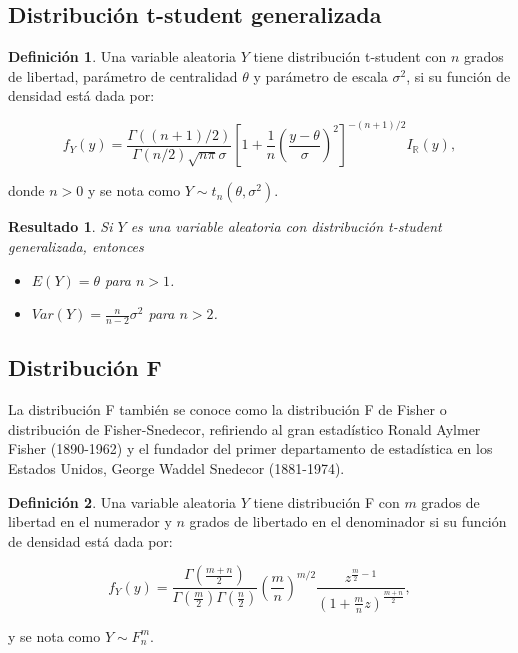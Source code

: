 \documentclass[
  10pt,
  spanish,
]{book}
\providecommand{\tightlist}{%
  \setlength{\itemsep}{0pt}\setlength{\parskip}{0pt}}
\newtheorem{proposition}{Resultado}[chapter]
\theoremstyle{definition}
\newtheorem{definition}{Definición}[chapter]
\theoremstyle{definition}
\theoremstyle{definition}
\theoremstyle{definition}
\theoremstyle{remark}
\begin{document}
\hypertarget{distribuciuxf3n-t-student-generalizada}{%
\subsection{Distribución t-student generalizada}\label{distribuciuxf3n-t-student-generalizada}}

\begin{definition}
\protect\hypertarget{def:unnamed-chunk-46}{}{\label{def:unnamed-chunk-46} }Una variable aleatoria \(Y\) tiene distribución t-student con \(n\) grados de libertad, parámetro de centralidad \(\theta\) y parámetro de escala \(\sigma^2\), si su función de densidad está dada por:

\begin{equation}
f_Y(y)=\frac{\Gamma((n+1)/2)}{\Gamma(n/2)\sqrt{n\pi}\sigma}\left[1+\frac{1}{n}\left(\frac{y-\theta}{\sigma}\right)^2\right]^{-(n+1)/2}
I_\mathbb{R}(y),
\end{equation}

donde \(n>0\) y se nota como \(Y\sim t_n(\theta,\sigma^2)\).
\end{definition}

\begin{proposition}
\protect\hypertarget{prp:unnamed-chunk-47}{}{\label{prp:unnamed-chunk-47} }Si \(Y\) es una variable aleatoria con distribución t-student generalizada, entonces

\begin{itemize}
\tightlist
\item
  \(E(Y)=\theta\) para \(n>1\).
\item
  \(Var(Y)=\frac{n}{n-2}\sigma^2\) para \(n>2\).
\end{itemize}
\end{proposition}

\hypertarget{distribuciuxf3n-f}{%
\subsection{Distribución F}\label{distribuciuxf3n-f}}

La distribución F también se conoce como la distribución F de Fisher o distribución de Fisher-Snedecor, refiriendo al gran estadístico Ronald Aylmer Fisher (1890-1962) y el fundador del primer departamento de estadística en los Estados Unidos, George Waddel Snedecor (1881-1974).

\begin{definition}
\protect\hypertarget{def:unnamed-chunk-48}{}{\label{def:unnamed-chunk-48} }Una variable aleatoria \(Y\) tiene distribución F con \(m\) grados de libertad en el numerador y \(n\) grados de libertado en el denominador si su función de densidad está dada por:

\begin{equation}
f_Y(y)=\frac{\Gamma(\frac{m+n}{2})}{\Gamma(\frac{m}{2})\Gamma(\frac{n}{2})}\left(\frac{m}{n}\right)^{m/2}\frac{z^{\frac{m}{2}-1}}{\left(1+\frac{m}{n}z\right)^{\frac{m+n}{2}}},
\end{equation}

y se nota como \(Y\sim F^m_n\).
\end{definition}
\end{document}

